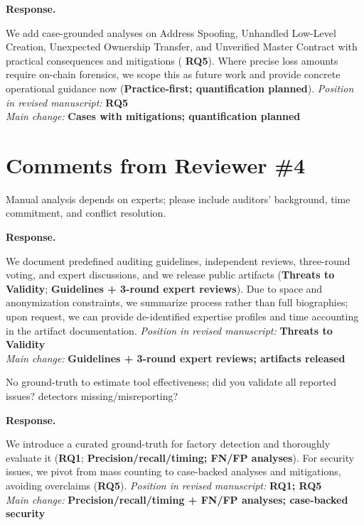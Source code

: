 \documentclass[acmsmall]{acmart}
\begin{document}
	\noindent
	\textbf{Response.}

	We add case-grounded analyses on Address Spoofing, Unhandled Low-Level Creation, Unexpected
	Ownership Transfer, and Unverified Master Contract with practical consequences and mitigations (
	{\textbf{RQ5}}). Where precise loss amounts require on-chain forensics, we scope this as future
	work and provide concrete operational guidance now ({\textbf{Practice-first; quantification planned}}).
	\textit{Position in revised manuscript:} {\color{red}\textbf{RQ5}}\\ \textit{Main change:}
	{\color{blue}\textbf{Cases with mitigations; quantification planned}}

	\newpage
	\section{Comments from Reviewer \#4}

	\begin{tcolorbox}
		[commentbox,title=Reviewer \#4 -- Comment 1] Manual analysis depends on experts; please
		include auditors' background, time commitment, and conflict resolution.
	\end{tcolorbox}

	\noindent
	\textbf{Response.}

	We document predefined auditing guidelines, independent reviews, three-round voting, and expert
	discussions, and we release public artifacts ({\textbf{Threats to Validity}}; {\textbf{Guidelines + 3-round expert reviews}}).
	Due to space and anonymization constraints, we summarize process rather than full biographies; upon
	request, we can provide de-identified expertise profiles and time accounting in the artifact
	documentation. \textit{Position in revised manuscript:}
	{\color{red}\textbf{Threats to Validity}}\\ \textit{Main change:}
	{\color{blue}\textbf{Guidelines + 3-round expert reviews; artifacts released}}

	\begin{tcolorbox}
		[commentbox,title=Reviewer \#4 -- Comment 2] No ground-truth to estimate tool effectiveness;
		did you validate all reported issues? detectors missing/misreporting?
	\end{tcolorbox}

	\noindent
	\textbf{Response.}

	We introduce a curated ground-truth for factory detection and thoroughly evaluate it ({\textbf{RQ1}};
	{\textbf{Precision/recall/timing; FN/FP analyses}}). For security issues, we pivot from mass counting
	to case-backed analyses and mitigations, avoiding overclaims ({\textbf{RQ5}}). \textit{Position
	in revised manuscript:} {\color{red}\textbf{RQ1; RQ5}}\\ \textit{Main change:}
	{\color{blue}\textbf{Precision/recall/timing + FN/FP analyses; case-backed security}}
\end{document}
